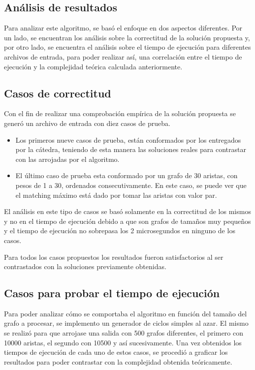 \documentclass[a4paper, 12pt]{article}
\begin{document}
\subsection*{Análisis de resultados}

Para analizar este algoritmo, se basó el enfoque en dos aspectos diferentes. Por un lado, se encuentran los análisis sobre la correctitud de la solución propuesta y, por otro lado, se encuentra el análisis sobre el tiempo de ejecución para diferentes archivos de entrada, para poder realizar así, una correlación entre el tiempo de ejecución y la complejidad teórica calculada anteriormente.

\subsection*{Casos de correctitud}
Con el fin de realizar una comprobación empírica de la solución propuesta se generó un archivo de entrada con diez casos de prueba.
\begin{itemize}
\item Los primeros nueve casos de prueba, están conformados por los entregados por la cátedra, teniendo de esta manera las soluciones reales para contrastar con las arrojadas por el algoritmo.
\item El último caso de prueba esta conformado por un grafo de 30 aristas, con pesos de 1 a 30, ordenados consecutivamente. En este caso, se puede ver que el matching máximo está dado por tomar las aristas con valor par.
\end{itemize}

El análisis en este tipo de casos se basó solamente en la correctitud de los mismos y no en el tiempo de ejecución debido a que son grafos de tama\~{n}os muy peque\~{n}os y el tiempo de ejecución no sobrepasa los 2 microsegundos en ninguno de los casos.

Para todos los casos propuestos los resultados fueron satisfactorios al ser contrastados con la soluciones previamente obtenidas.

\subsection*{Casos para probar el tiempo de ejecución}
Para poder analizar cómo se comportaba el algoritmo en función del tama\~{n}o del grafo a procesar, se implemento un generador de ciclos simples al azar. El mismo se realizó para que arrojase una salida con 500 grafos diferentes, el primero con 10000 aristas, el segundo con 10500 y así sucesivamente. Una vez obtenidos los tiempos de ejecución de cada uno de estos casos, se procedió a graficar los resultados para poder contrastar con la complejidad obtenida teóricamente.
\end{document}
